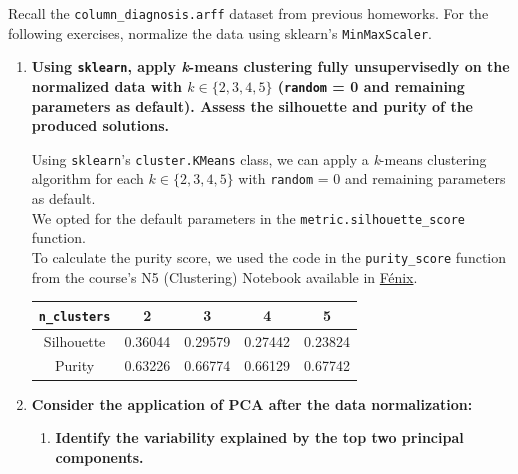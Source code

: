 \documentclass[12pt]{article}
\begin{document}
\noindent Recall the \texttt{column\_diagnosis.arff} dataset from previous homeworks. For the following exercises,
normalize the data using sklearn's \texttt{MinMaxScaler}.

\begin{enumerate}[leftmargin=\labelsep]
    \item \textbf{Using \texttt{sklearn}, apply \textit{k}-means clustering fully unsupervisedly on the normalized data with
          $k \in \{2,3,4,5\}$ (\textnormal{\texttt{random} = 0} and remaining parameters as default).
          Assess the silhouette and purity of the produced solutions.}

          \vskip 0.3cm
          Using \texttt{sklearn}'s \texttt{cluster.KMeans} class, we can apply a \textit{k}-means clustering algorithm
          for each $k \in \{2,3,4,5\}$ with \texttt{random} = 0 and remaining parameters as default. \\
          We opted for the default parameters in the \texttt{metric.silhouette\_score} function. \\
          To calculate the purity score, we used the code in the \texttt{purity\_score} function from the
          course's N5 (Clustering) Notebook available in
          \href{https://fenix.tecnico.ulisboa.pt/disciplinas/Apre2/2023-2024/1-semestre/notebooks}{Fénix}.

          

          \begin{center}
              \captionsetup{type=table}
              \begin{tabular}{c|cccc}
                  \texttt{n\_clusters} & 2 & 3 & 4 & 5 \\
                  \hline
                  Silhouette           & 0.36044 & 0.29579 & 0.27442 & 0.23824 \\
                  Purity               & 0.63226 & 0.66774 & 0.66129 & 0.67742
              \end{tabular}
              \label{ex1p-silhouette-purity}
          \end{center}

    \item \textbf{Consider the application of PCA after the data normalization:}

    \begin{enumerate}
        \item \textbf{Identify the variability explained by the top two principal components.}


\end{enumerate}
\end{enumerate}
\end{document}
